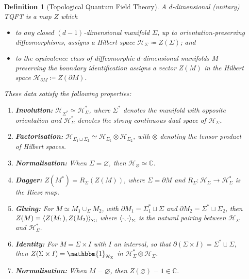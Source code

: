 \documentclass[10pt,a4paper]{amsart}
\newtheorem{definition}{Definition}
\newcommand{\C}{\mathbb{C}}
\newcommand{\del}{\partial}
\begin{document}
\begin{definition}[Topological Quantum Field Theory]
\label{def:TQFT}
    A $d$-dimensional (unitary) TQFT is a map $Z$ which
    \begin{itemize}
        \item to any closed $(d-1)$-dimensional manifold $\Sigma$, up to orientation-preserving diffeomorphisms, assigns a Hilbert space $\mathcal H_{\Sigma}\coloneqq Z(\Sigma)$; and
        \item to the equivalence class of diffeomorphic $d$-dimensional manifolds $M$ preserving the boundary identification assigns a vector $Z(M)$ in the Hilbert space $\mathcal H_{\partial M}\coloneqq Z(\del M)$.
    \end{itemize}
    These data satisfy the following properties:
    \begin{enumerate}
        \item \textbf{Involution:} $\mathcal H_{\Sigma^*}\simeq \mathcal H_{\Sigma}^*$, where $\Sigma^*$ denotes the manifold with opposite orientation and $\mathcal H_{\Sigma}^*$ denotes the strong continuous dual space of $\mathcal H_{\Sigma}$.
        \item \textbf{Factorisation:} $\mathcal H_{\Sigma_1\sqcup\Sigma_2}\simeq \mathcal H_{\Sigma_1}\otimes\mathcal H_{\Sigma_2}$, with $\otimes$ denoting the tensor product of Hilbert spaces.
        \item \textbf{Normalisation:} When $\Sigma=\varnothing$, then $\mathcal H_{\varnothing}\simeq \C$.
        \item \textbf{Dagger:} $Z(M^*)=R_{\Sigma}(Z(M))$, where $\Sigma=\del M$ and $R_{\Sigma}:\mathcal H_{\Sigma}\to \mathcal H_{\Sigma}^*$ is the Riesz map.
        \item \textbf{Gluing:} For $M\simeq M_1\cup_{\Sigma} M_2$, with $\del M_1=\Sigma_1^*\sqcup \Sigma$ and $\del M_2=\Sigma^*\sqcup \Sigma_2$, then $Z(M)=\braket{Z(M_1),Z(M_2)}_{\Sigma}$, where $\braket{\cdot,\cdot}_\Sigma$ is the natural pairing between $\mathcal H_{\Sigma}$ and $\mathcal H_{\Sigma}^*$.
        \item \textbf{Identity:} For $M=\Sigma\times I$ with $I$ an interval, so that $\del(\Sigma\times I)=\Sigma^*\sqcup\Sigma$, then $Z(\Sigma\times I)=\mathbbm{1}_{\mathcal H_{\Sigma}}$ in $\mathcal H_{\Sigma}^*\otimes \mathcal H_{\Sigma}$.
        \item \textbf{Normalisation:} When $M=\varnothing$, then $Z(\varnothing)=1\in \C$.
    \end{enumerate}
\end{definition}
\end{document}
